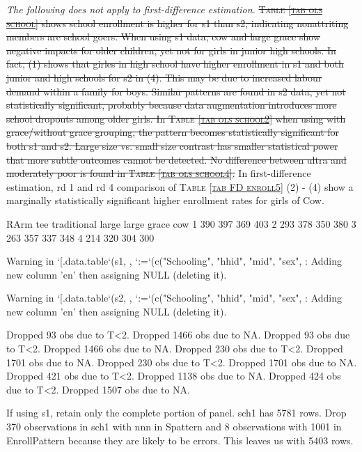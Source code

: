 \begin{palepinkleftbar}
\begin{finding}
\textit{The following does not apply to first-difference estimation.} \sout{\textsc{\small Table \ref{tab ols school}} shows school enrollment is higher for \textsf{s1} than \textsf{s2}, indicating nonattriting members are school goers. When using \textsf{s1} data, \textsf{cow} and \textsf{large grace} show negative impacts for older children, yet not for girls in junior high schools. In fact, (1) shows that girles in high school have higher enrollment in \textsf{s1} and both junior and high schools for \textsf{s2} in (4). This may be due to increased labour demand within a family for boys. Similar patterns are found in \textsf{s2} data, yet not statistically significant, probably because data augmentation introduces more school dropouts among older girls. In \textsc{\small Table \ref{tab ols school2}} when using with grace/without grace grouping, the pattern becomes statistically significant for both \textsf{s1} and \textsf{s2}. Large size vs. small size contrast has smaller statistical power that more subtle outcomes cannot be detected. No difference between ultra and moderately poor is found in \textsc{\small Table \ref{tab ols school4}}.} In first-difference estimation, rd 1 and rd 4 comparison of \textsc{\normalsize Table \ref{tab FD enroll5}} (2) - (4) show a marginally statistically significant higher enrollment rates for girls of \textsf{Cow}. 
\end{finding}
\end{palepinkleftbar}




\begin{Schunk}
\begin{Soutput}
   RArm
tee traditional large large grace cow
  1         390   397         369 403
  2         293   378         350 380
  3         263   357         337 348
  4         214   320         304 300
\end{Soutput}
\begin{Soutput}
Warning in `[.data.table`(s1, , `:=`(c("Schooling", "hhid", "mid", "sex", : Adding new column 'en' then assigning NULL (deleting it).
\end{Soutput}
\begin{Soutput}
Warning in `[.data.table`(s2, , `:=`(c("Schooling", "hhid", "mid", "sex", : Adding new column 'en' then assigning NULL (deleting it).
\end{Soutput}
\begin{Soutput}
Dropped 93 obs due to T<2.
Dropped 1466 obs due to NA.
Dropped 93 obs due to T<2.
Dropped 1466 obs due to NA.
Dropped 230 obs due to T<2.
Dropped 1701 obs due to NA.
Dropped 230 obs due to T<2.
Dropped 1701 obs due to NA.
Dropped 421 obs due to T<2.
Dropped 1138 obs due to NA.
Dropped 424 obs due to T<2.
Dropped 1507 obs due to NA.
\end{Soutput}
\end{Schunk}
If using \textsf{s1}, retain only the complete portion of panel. \textsf{sch1} has 5781 rows. Drop 370 observations in \textsf{sch1} with nnn in \textsf{Spattern} and 8 observations with 1001 in \textsf{EnrollPattern} because they are likely to be errors. This leaves us with 5403 rows. 

